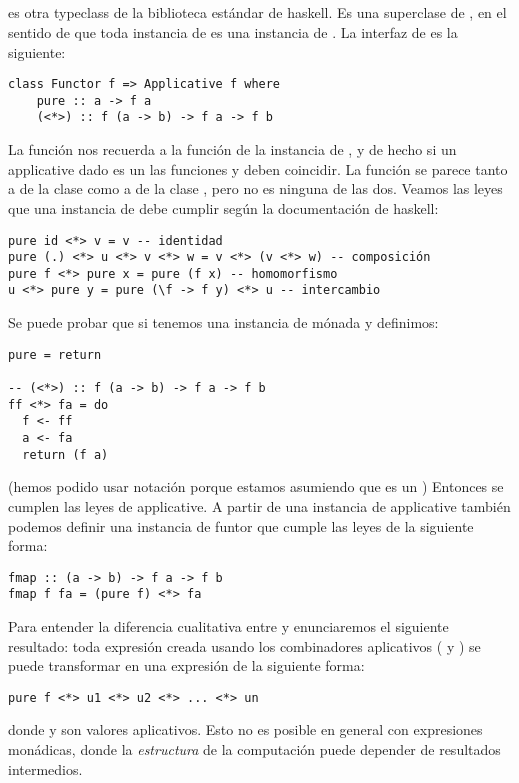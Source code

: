 \subsection{}
 es otra typeclass de la biblioteca estándar
de haskell. Es una superclase de , en el sentido de que
toda instancia de  es una instancia de
. La interfaz de  es la siguiente:
\begin{verbatim}
class Functor f => Applicative f where
    pure :: a -> f a
    (<*>) :: f (a -> b) -> f a -> f b
\end{verbatim}
La función  nos recuerda a la función  de la
instancia de , y de hecho si un applicative dado es
un  las funciones  y  deben coincidir.
La función \cod{(<*>)} se parece tanto a  de la clase
 como a \cod{(>{}>=)} de la clase , pero no
es ninguna de las dos. Veamos las leyes que una instancia de
 debe cumplir según la documentación de haskell:
\begin{verbatim}
pure id <*> v = v -- identidad
pure (.) <*> u <*> v <*> w = v <*> (v <*> w) -- composición
pure f <*> pure x = pure (f x) -- homomorfismo
u <*> pure y = pure (\f -> f y) <*> u -- intercambio
\end{verbatim}
Se puede probar que si tenemos una instancia de mónada y
definimos:
\begin{verbatim}
pure = return

-- (<*>) :: f (a -> b) -> f a -> f b
ff <*> fa = do
  f <- ff
  a <- fa
  return (f a)
\end{verbatim}
(hemos podido usar notación  porque estamos asumiendo
que  es un )
Entonces se cumplen las leyes de applicative. A partir de
una instancia de applicative también podemos definir una instancia
de funtor que cumple las leyes de la siguiente forma:
\begin{verbatim}
fmap :: (a -> b) -> f a -> f b
fmap f fa = (pure f) <*> fa
\end{verbatim}

Para entender la diferencia cualitativa entre  y
 enunciaremos el siguiente resultado: toda expresión
creada usando los combinadores aplicativos ( y \cod{(<*>)})
se puede transformar en una expresión de la siguiente forma:
\begin{verbatim}
pure f <*> u1 <*> u2 <*> ... <*> un
\end{verbatim}
donde  y  son valores
aplicativos. Esto no es posible en general con expresiones monádicas,
donde la \textit{estructura} de la computación puede depender de
resultados intermedios.

